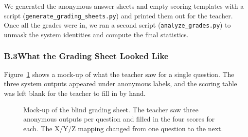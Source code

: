 We generated the anonymous answer sheets and empty scoring templates with a
script (\texttt{generate\_grading\_sheets.py}) and printed them out for the
teacher. Once all the grades were in, we ran a second script
(\texttt{analyze\_grades.py}) to unmask the system identities and compute
the final statistics.

\subsubsection*{B.3\quad What the Grading Sheet Looked Like}

Figure~\ref{fig:blind-sheet-sample} shows a mock-up of what the teacher
saw for a single question. The three system outputs appeared under anonymous
labels, and the scoring table was left blank for the teacher to fill in by
hand.

\begin{figure}[H]
\centering
{}
\caption{Mock-up of the blind grading sheet. The teacher saw three anonymous
outputs per question and filled in the four scores for each. The X/Y/Z
mapping changed from one question to the next.}
\label{fig:blind-sheet-sample}
\end{figure}

